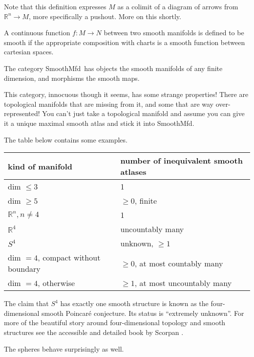 \documentclass[12pt]{article}
\newcommand{\rr}{\ensuremath{\mathbb{R}}}
\newcommand{\smfd}{\textsf{SmoothMfd}}
\begin{document}
Note that this definition expresses $M$ as a colimit of a diagram of arrows from $\rr^n\to M$, more specifically a pushout. More on this shortly.

A continuous function $f:M\to N$ between two smooth manifolds is defined to be smooth if the appropriate composition with charts is a smooth function between cartesian spaces.

The category \smfd\ has objects the smooth manifolds of any finite dimension, and morphisms the smooth maps.

This category, innocuous though it seems, has some strange properties! There are topological manifolds that are missing from it, and some that are way over-represented! You can't just take a topological manifold and assume you can give it a unique maximal smooth atlas and stick it into \smfd.

The table below contains some examples.

\begin{center}
\label{table:smoothstructures}
\begin{tabular}{|l|l|}
\hline
kind of manifold & number of inequivalent smooth atlases \\ \hline
dim $\leq 3$ & 1 \\ \hline
dim $\geq 5$ & $\geq 0$, finite \\ \hline
$\rr^n, n\neq 4$ & 1 \\ \hline
$\rr^4$ & uncountably many \\ \hline
$S^4$ & unknown, $\geq 1$ \\ \hline
dim $= 4$, compact without boundary & $\geq 0$, at most countably many \\ \hline
dim $= 4$, otherwise & $\geq 1$, at most uncountably many \\ \hline
\end{tabular}
\end{center}

The claim that $S^4$ has exactly one smooth structure is known as the four-dimensional smooth Poincaré conjecture. Its status is ``extremely unknown''. For more of the beautiful story around four-dimensional topology and smooth structures see the accessible and detailed book by Scorpan \cite{scorpan_wild_2005}.

The spheres behave surprisingly as well.
\end{document}

